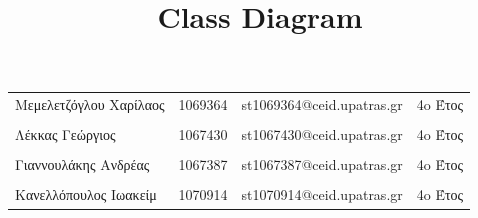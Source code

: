 \documentclass{../ol-softwaremanual}
\begin{document}
	
	
	\begin{titlepage}
		
		
		\title{\en Class Diagram \\}
	\end{titlepage}
	
	
	\maketitle
	
	\newpage
	
	
	\vspace{20pt}
	
	
	
	\begin{table}[htbp!]
		
		\begin{tabular}{llll}
			Μεμελετζόγλου Χαρίλαος & 1069364 & \en st1069364@ceid.upatras.gr & 4o Έτος   \\ 
			\\ Λέκκας Γεώργιος      &      1067430    &   \en st1067430@ceid.upatras.gr & 4o Έτος  \\
			\\ Γιαννουλάκης Ανδρέας        &   1067387       & \en st1067387@ceid.upatras.gr & 4o Έτος           \\
			\\ Κανελλόπουλος Ιωακείμ        &  1070914        &    \en st1070914@ceid.upatras.gr & 4o Έτος        \\ 
		\end{tabular}
	\end{table}
	
\end{document}
